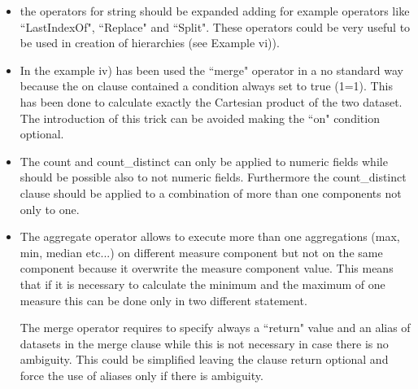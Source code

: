 \begin{itemize}
\item the operators for string should be expanded adding for example operators like ``LastIndexOf", ``Replace" and ``Split". These operators could be very useful to be used in creation of hierarchies (see Example vi)). 
\item In the example iv) has been used the ``merge" operator in a no standard way because the on clause contained a condition always set to true (1=1). This has been done to calculate exactly the Cartesian product of the two dataset. The introduction of this trick can be avoided making the ``on" condition optional.

\item The count and count\_distinct  can only be applied to numeric fields while should be possible also to not numeric fields. Furthermore the count\_distinct clause should be applied to a combination of more than one components not only to one.

\item The aggregate operator allows to execute more than one aggregations (max, min, median etc...) on different measure component but not on the same component because it overwrite the measure component value. This means that if it is necessary to calculate the minimum and the maximum of one measure this can be done only in two different statement. 


\noindent
The merge operator requires to specify always a ``return" value and an alias of datasets in the merge clause while this is not necessary in case there is no ambiguity. This could be simplified leaving the clause return optional and force the use of aliases only if there is ambiguity.

\end{itemize}

